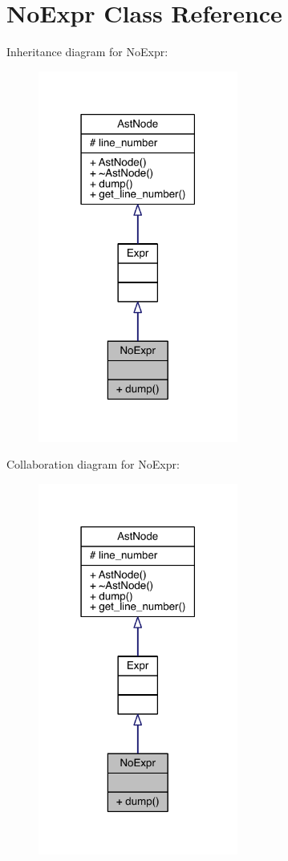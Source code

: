 \hypertarget{class_no_expr}{}\section{No\+Expr Class Reference}
\label{class_no_expr}


Inheritance diagram for No\+Expr\+:\nopagebreak
\begin{figure}[H]
\begin{center}
\leavevmode
\includegraphics[width=186pt]{class_no_expr__inherit__graph}
\end{center}
\end{figure}


Collaboration diagram for No\+Expr\+:\nopagebreak
\begin{figure}[H]
\begin{center}
\leavevmode
\includegraphics[width=186pt]{class_no_expr__coll__graph}
\end{center}
\end{figure}
